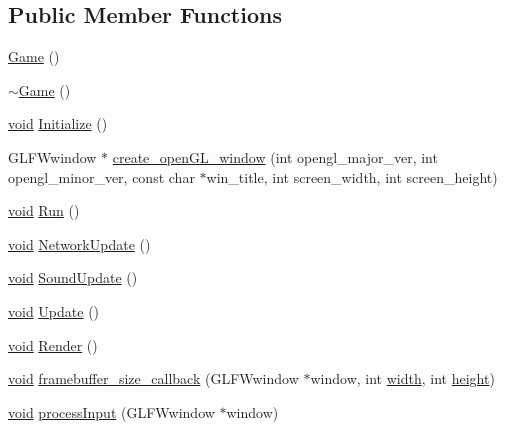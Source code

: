 \subsection*{Public Member Functions}
\begin{DoxyCompactItemize}
\item 
\hyperlink{classGame_ad59df6562a58a614fda24622d3715b65}{Game} ()
\item 
\hyperlink{classGame_ae3d112ca6e0e55150d2fdbc704474530}{$\sim$\+Game} ()
\item 
\hyperlink{imgui__impl__opengl3__loader_8h_ac668e7cffd9e2e9cfee428b9b2f34fa7}{void} \hyperlink{classGame_adc01a7fae5261c95f7e6b41024e6c533}{Initialize} ()
\item 
G\+L\+F\+Wwindow $\ast$ \hyperlink{classGame_ad25806b818108918a7e5fc5bd71f5de3}{create\+\_\+open\+G\+L\+\_\+window} (int opengl\+\_\+major\+\_\+ver, int opengl\+\_\+minor\+\_\+ver, const char $\ast$win\+\_\+title, int screen\+\_\+width, int screen\+\_\+height)
\item 
\hyperlink{imgui__impl__opengl3__loader_8h_ac668e7cffd9e2e9cfee428b9b2f34fa7}{void} \hyperlink{classGame_a96341ca5b54d90adc3ecb3bf0bcd2312}{Run} ()
\item 
\hyperlink{imgui__impl__opengl3__loader_8h_ac668e7cffd9e2e9cfee428b9b2f34fa7}{void} \hyperlink{classGame_aad080642dbc2dcfb284e267f2c718a5c}{Network\+Update} ()
\item 
\hyperlink{imgui__impl__opengl3__loader_8h_ac668e7cffd9e2e9cfee428b9b2f34fa7}{void} \hyperlink{classGame_a354ce6e35d03d24914d1ec79a85ce2c4}{Sound\+Update} ()
\item 
\hyperlink{imgui__impl__opengl3__loader_8h_ac668e7cffd9e2e9cfee428b9b2f34fa7}{void} \hyperlink{classGame_a1c5373c68261c54aff03e6abe40fee52}{Update} ()
\item 
\hyperlink{imgui__impl__opengl3__loader_8h_ac668e7cffd9e2e9cfee428b9b2f34fa7}{void} \hyperlink{classGame_a0897730fc9fed789f6c0f11d21a0c14a}{Render} ()
\item 
\hyperlink{imgui__impl__opengl3__loader_8h_ac668e7cffd9e2e9cfee428b9b2f34fa7}{void} \hyperlink{classGame_add1087a248a7e136debe003af25f9fa2}{framebuffer\+\_\+size\+\_\+callback} (G\+L\+F\+Wwindow $\ast$window, int \hyperlink{imgui__impl__opengl3__loader_8h_a6879d830f164725df67adeeabca3ea47}{width}, int \hyperlink{imgui__impl__opengl3__loader_8h_a60075de22f90a1223dc0bea98d2ee4d5}{height})
\item 
\hyperlink{imgui__impl__opengl3__loader_8h_ac668e7cffd9e2e9cfee428b9b2f34fa7}{void} \hyperlink{classGame_a600b6bf8efd1874f5b5bdb8fdc48e549}{process\+Input} (G\+L\+F\+Wwindow $\ast$window)

\end{DoxyCompactItemize}
